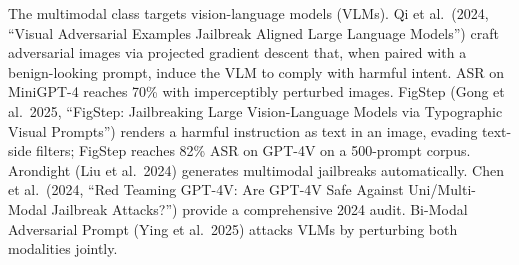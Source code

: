 The multimodal class targets vision-language models (VLMs). Qi et al.~(2024, ``Visual Adversarial Examples Jailbreak Aligned Large Language Models'') craft adversarial images via projected gradient descent that, when paired with a benign-looking prompt, induce the VLM to comply with harmful intent. ASR on MiniGPT-4 reaches 70\% with imperceptibly perturbed images. FigStep (Gong et al.~2025, ``FigStep: Jailbreaking Large Vision-Language Models via Typographic Visual Prompts'') renders a harmful instruction as text in an image, evading text-side filters; FigStep reaches 82\% ASR on GPT-4V on a 500-prompt corpus. Arondight (Liu et al.~2024) generates multimodal jailbreaks automatically. Chen et al.~(2024, ``Red Teaming GPT-4V: Are GPT-4V Safe Against Uni/Multi-Modal Jailbreak Attacks?'') provide a comprehensive 2024 audit. Bi-Modal Adversarial Prompt (Ying et al.~2025) attacks VLMs by perturbing both modalities jointly.


